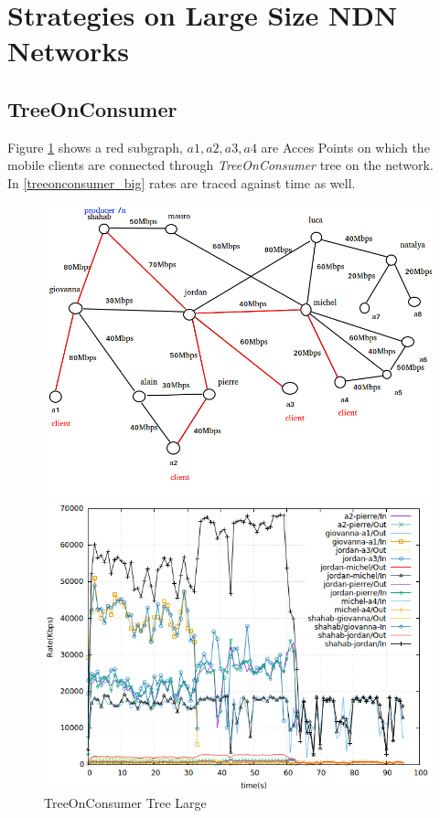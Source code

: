  

\section{Strategies on Large Size NDN Networks}

\subsection{TreeOnConsumer}
Figure \ref{TreeOnConsumer_big} shows a red subgraph, $a1, a2, a3, a4$ are Acces Points on which the mobile clients are connected through \textit{TreeOnConsumer} tree on the network.\\
In \ref{treeonconsumer_big}  rates are traced against time as well.

\begin{figure}[H]

\begin{center}

\includegraphics[scale = 0.4]{Figures/TreeOnConsumer_big.png}

\caption{TreeOnConsumer Tree Large} \label{TreeOnConsumer_big} 


\includegraphics[scale = 0.4]{Figures/treeonconsumer_big.png}


\end{center}
\end{figure}
